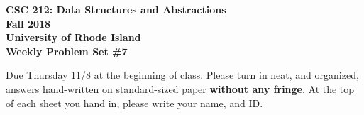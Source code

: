 \documentclass[11pt]{article}
\begin{document}
    \thispagestyle{empty}
    
    \begin{center}
        {\Large\bf CSC 212: Data Structures and Abstractions}\\
        \medskip
        {\Large\bf Fall 2018}\\
        \medskip
        {\Large\bf University of Rhode Island}\\
        \bigskip
        {\Large\bf Weekly Problem Set \#7}
    \end{center}
    
    Due Thursday 11/8 at the beginning of class. Please turn in neat, and organized, answers hand-written on standard-sized paper \textbf{without any fringe}. At the top of each sheet you hand in, please write your name, and ID.
    
\end{document}
